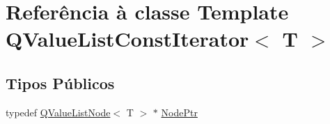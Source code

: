 \hypertarget{class_q_value_list_const_iterator}{\section{Referência à classe Template Q\-Value\-List\-Const\-Iterator$<$ T $>$}
\label{class_q_value_list_const_iterator}
}
\subsection*{Tipos Públicos}
\begin{DoxyCompactItemize}
\item 
typedef \hyperlink{class_q_value_list_node}{Q\-Value\-List\-Node}$<$ T $>$ $\ast$ \hyperlink{class_q_value_list_const_iterator_a33149bd41c7bb5c96791c9455305e769}{Node\-Ptr}
\end{DoxyCompactItemize}
